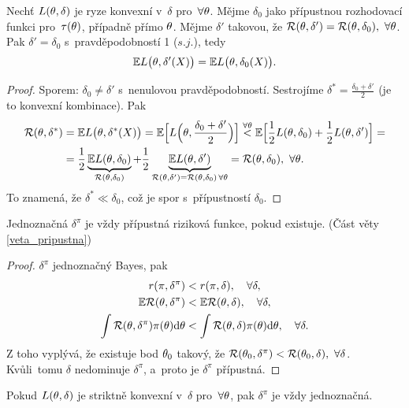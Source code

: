 \begin{theorem}\label{veta_rovnost}
	Nechť $L(\theta,\delta)$ je ryze konvexní v~$\delta$ pro~$\forall\theta$. Mějme $\delta_0$ jako přípustnou rozhodovací funkci pro~$\tau(\theta)$, případně přímo $\theta$. Mějme $\delta'$ takovou, že $\mathcal{R}(\theta,\delta')=\mathcal{R}(\theta,\delta_0),~\forall\theta$. Pak $\delta'=\delta_0$ s~pravděpodobností 1 ($s.j.$), tedy $$ \mathbb{E} L\big(\theta,\delta'(X)\big)=\mathbb{E} L\big(\theta,\delta_0(X)\big).$$
	\begin{proof}
		Sporem: $\delta_0\neq\delta'$ s~nenulovou pravděpodobností. Sestrojíme $\delta^\ast=\frac{\delta_0+\delta'}{2}$ (je to konvexní kombinace). Pak
		\[
		\begin{split}
		\mathcal{R}(\theta,\delta^\ast)&=\mathbb{E} L\big(\theta,\delta^\ast(X)\big)=\mathbb{E}\Big[L\Big(\theta,\frac{\delta_0+\delta'}{2}\Big)\Big]\overset{\forall\theta}{<}\mathbb{E}\Big[\frac{1}{2}L(\theta,\delta_0)+\frac{1}{2}L(\theta,\delta')\Big]=\\&= \frac{1}{2}\underbrace{\mathbb{E} L(\theta,\delta_0)}_{\mathcal{R}(\theta,\delta_0)}+\frac{1}{2}\underbrace{\mathbb{E} L(\theta,\delta')}_{\mathcal{R}(\theta,\delta')=\mathcal{R}(\theta,\delta_0)\,\forall\theta}=\mathcal{R}(\theta,\delta_0),~\forall\theta.
		\end{split}
		\] 
		To znamená, že $\delta^\ast\ll\delta_0$, což je spor s~přípustností $\delta_0$.
	\end{proof}
\end{theorem}
\begin{theorem} \label{veta_prip}
	Jednoznačná $\delta^\pi$ je vždy přípustná riziková funkce, pokud existuje. (Část věty \ref{veta_pripustna})
	\begin{proof}
		$\delta^\pi$ jednoznačný Bayes, pak \[
		\begin{split}
		r(\pi,\delta^\pi)&<r(\pi,\delta),\quad\forall\delta,\\
		\mathbb{E} \mathcal{R}(\theta,\delta^\pi)&<\mathbb{E} \mathcal{R}(\theta,\delta),\quad\forall\delta,\\
		\int\mathcal{R}(\theta,\delta^\pi)\pi(\theta)\mathrm{d}\theta&<\int\mathcal{R}(\theta,\delta)\pi(\theta)\mathrm{d}\theta,\quad\forall\delta.		
		\end{split}
		\]
		Z toho vyplývá, že existuje bod $\theta_0$ takový, že  $\mathcal{R}(\theta_0,\delta^\pi)<\mathcal{R}(\theta_0,\delta),~\forall\delta$. Kvůli~tomu $\delta$ nedominuje $\delta^\pi$, a~proto je $\delta^\pi$ přípustná.
	\end{proof}
\end{theorem}
\begin{remark}
	Pokud $L(\theta,\delta)$ je striktně konvexní v~$\delta$ pro~$\forall\theta$, pak $\delta^\pi$ je vždy jednoznačná.
\end{remark}

